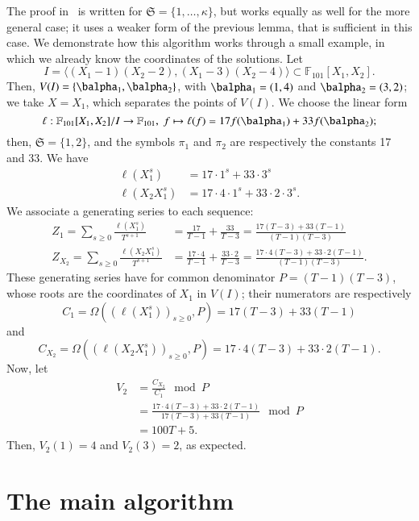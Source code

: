 \documentclass[final,1p,times,authoryear]{elsarticle}
\newcommand{\minpoly}{P}
\newcommand{\lf}{X}
\def\F {\ensuremath{\mathbb{F}}}
\begin{document}
The proof in~\cite{BoSaSc03} is written for
$\mathfrak{S}=\{1,\dots,\kappa\}$, but works equally as well for the
more general case; it uses a weaker form of the previous lemma, that
is sufficient in this case.  We demonstrate how this algorithm works
through a small example, in which we already know the coordinates of
the solutions. Let
$$I = \langle (X_1-1)(X_2-2),(X_1-3)(X_2-4)\rangle \subset
\F_{101}[X_1,X_2].$$ Then, $V(I) = \{\balpha_1,\balpha_2\}$,
with $\balpha_1= (1,4)$ and $\balpha_2=(3,2)$; we take
$\lf=X_1$, which separates the points of $V(I)$.  We choose the linear form
\[
  \ell: \F_{101}[X_1,X_2]/I \to \F_{101},\;
  f \mapsto \ell(f) = 17 f(\balpha_1) + 33 f(\balpha_2);
\]
then, $\mathfrak{S}=\{1,2\}$, and the symbols $\pi_1$ and $\pi_2$ 
are respectively the constants 17 and 33. We have
\begin{align*}
  \ell(X_1^s) &= 17 \cdot 1^s + 33 \cdot 3^s\\
  \ell(X_2X_1^s) &= 17 \cdot 4 \cdot 1^s + 33 \cdot 2 \cdot 3^s.
\end{align*} 
We associate a generating series to each sequence:
\begin{align*}
  Z_1 = \sum_{s \ge 0} \frac{\ell(X^s_1)}{T^{s+1}}
&= \frac{17}{T-1} + \frac{33}{T-3}
= \frac{17(T-3)+33(T-1)}{(T-1)(T-3)} \\
Z_{X_2} = \sum_{s\ge0} \frac{\ell(X_2X_1^s)}{T^{s+1} }
&= \frac{17\cdot 4}{T-1} + \frac{33 \cdot 2}{T-3}
= \frac{17\cdot 4 (T-3) + 33\cdot 2(T-1)}{(T-1)(T-3)}.
\end{align*}
These generating series have for common denominator $\minpoly = (T-1)(T-3)$,
whose roots are the coordinates of $X_1$ in $V(I)$;
their numerators are respectively
$$C_{1} = \Omega((\ell(X^s_1))_{s\ge 0},\minpoly) = 17 (T-3) + 33(T-1)$$
and
$$C_{X_2} = \Omega((\ell(X_2X^s_1))_{s\ge 0},\minpoly) = 17\cdot 4 (T-3) + 33\cdot 2(T-1).$$
Now, let
\begin{align*}
  V_2 
&=\frac{C_{X_2}}{C_1} \mod \minpoly\\
&=\frac{17\cdot 4 (T-3) + 33\cdot 2(T-1)}{17(T-3)+33(T-1)} \mod \minpoly\\
&=100 T +5.
\end{align*}
Then, $V_2(1) = 4$ and $V_2(3) = 2$, as expected.


\section{The main algorithm}\label{sec:main}
\end{document}
